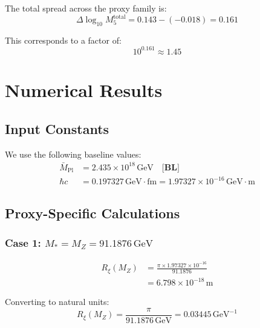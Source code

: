 \documentclass[11pt,a4paper]{article}
\newcommand{\Mpl}{\bar{M}_{\mathrm{Pl}}}
\newcommand{\Mfive}{M_5}
\newcommand{\Rxi}{R_\xi}
\newcommand{\MZ}{M_Z}
\newcommand{\Mstar}{M_*}
\newcommand{\GeV}{\,\mathrm{GeV}}
\newcommand{\tagBL}{\textbf{[BL]}}
\theoremstyle{definition}
\theoremstyle{plain}
\theoremstyle{remark}
\begin{document}
The total spread across the proxy family is:
\begin{equation}
\boxed{\Delta\log_{10}\Mfive^{\mathrm{total}} = 0.143 - (-0.018) = 0.161}
\label{eq:total-spread}
\end{equation}

This corresponds to a factor of:
\begin{equation}
10^{0.161} \approx 1.45
\label{eq:total-factor}
\end{equation}

\section{Numerical Results}
\label{sec:numerical}

\subsection{Input Constants}

We use the following baseline values:
\begin{align}
\Mpl &= 2.435 \times 10^{18}\GeV \quad \tagBL{} \label{eq:Mpl-input} \\
\hbar c &= 0.197327\GeV\cdot\mathrm{fm} = 1.97327 \times 10^{-16}\GeV\cdot\mathrm{m} \label{eq:hbarc-input}
\end{align}

\subsection{Proxy-Specific Calculations}

\subsubsection{Case 1: $\Mstar = \MZ = 91.1876\GeV$}

\begin{align}
\Rxi(\MZ) &= \frac{\pi \times 1.97327 \times 10^{-16}}{91.1876} \label{eq:Rxi-MZ-calc} \\
&= 6.798 \times 10^{-18}\,\mathrm{m} \label{eq:Rxi-MZ-result}
\end{align}

Converting to natural units:
\begin{equation}
\Rxi(\MZ) = \frac{\pi}{91.1876\GeV} = 0.03445\GeV^{-1}
\label{eq:Rxi-MZ-natural}
\end{equation}
\end{document}
